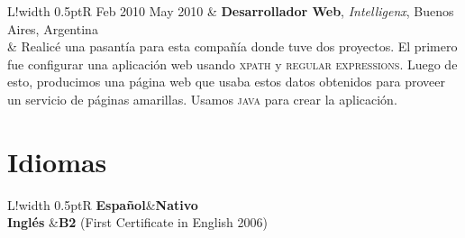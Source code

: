 \documentclass[10pt]{article}
\newcommand\VRule{\color{lightgray}\vrule width 0.5pt}
\begin{document}
\begin{tabular}{L!{\VRule}R}
Feb 2010 May 2010 & \textbf{Desarrollador Web}, \textit{Intelligenx}, Buenos Aires, Argentina\\
& \vspace{-0.7cm} Realicé una pasantía para esta compañía donde tuve dos proyectos.
El primero fue configurar una aplicación web usando \textsc{xpath} y 
\textsc{regular expressions}.
Luego de esto, producimos una página web que usaba estos datos obtenidos para proveer un servicio de páginas amarillas.
Usamos \textsc{java} para crear la aplicación.\\
\end{tabular}



\section*{Idiomas}

\begin{tabular}{L!{\VRule}R}
{\bf Español}&{\bf Nativo}\\
{\bf Inglés} &{\bf B2} (First Certificate in English 2006)\\
\end{tabular}
\end{document}

